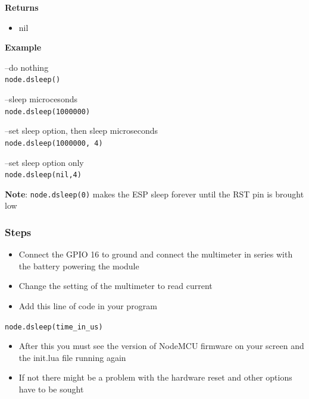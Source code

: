 \documentclass[16pt]{article}
\begin{document}
\textbf{Returns}

\begin{itemize}

\item
  nil
\end{itemize}

\textbf{Example}
\vspace{0.1cm}

--do nothing\\
\texttt{node.dsleep()}\\

\vspace{0.1cm}

--sleep microcesonds\\
\texttt{node.dsleep(1000000)}\\

\vspace{0.1cm}

--set sleep option, then sleep microseconds\\
\texttt{node.dsleep(1000000, 4)}\\

\vspace{0.1cm}

--set sleep option only\\
\texttt{node.dsleep(nil,4)}

\vspace{0.3cm}

\textbf{Note}: \texttt{node.dsleep(0)} makes the ESP sleep forever until
the RST pin is brought low


\vspace{0.5cm}
\subsubsection{Steps}

\begin{itemize}

\item
  Connect the GPIO 16 to ground and connect the multimeter in series
  with the battery powering the module
\item
  Change the setting of the multimeter to read current
\item
  Add this line of code in your program
\end{itemize}

\texttt{node.dsleep(time\_in\_us)}

\begin{itemize}

\item
  After this you must see the version of NodeMCU firmware on your screen
  and the init.lua file running again
\item
  If not there might be a problem with the hardware reset and other
  options have to be sought
\end{itemize}
\end{document}
